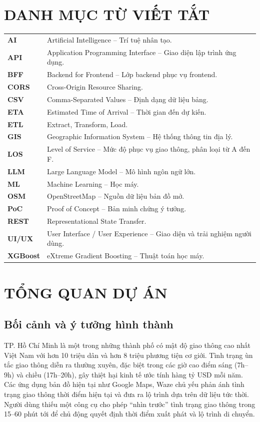 \documentclass[12pt,a4paper]{article}
\begin{document}
\section*{DANH MỤC TỪ VIẾT TẮT}
\begin{longtable}{L{3cm}L{11cm}}
\textbf{AI} & Artificial Intelligence -- Trí tuệ nhân tạo. \\
\textbf{API} & Application Programming Interface -- Giao diện lập trình ứng dụng. \\
\textbf{BFF} & Backend for Frontend -- Lớp backend phục vụ frontend. \\
\textbf{CORS} & Cross-Origin Resource Sharing. \\
\textbf{CSV} & Comma-Separated Values -- Định dạng dữ liệu bảng. \\
\textbf{ETA} & Estimated Time of Arrival -- Thời gian đến dự kiến. \\
\textbf{ETL} & Extract, Transform, Load. \\
\textbf{GIS} & Geographic Information System -- Hệ thống thông tin địa lý. \\
\textbf{LOS} & Level of Service -- Mức độ phục vụ giao thông, phân loại từ A đến F. \\
\textbf{LLM} & Large Language Model -- Mô hình ngôn ngữ lớn. \\
\textbf{ML} & Machine Learning -- Học máy. \\
\textbf{OSM} & OpenStreetMap -- Nguồn dữ liệu bản đồ mở. \\
\textbf{PoC} & Proof of Concept -- Bản minh chứng ý tưởng. \\
\textbf{REST} & Representational State Transfer. \\
\textbf{UI/UX} & User Interface / User Experience -- Giao diện và trải nghiệm người dùng. \\
\textbf{XGBoost} & eXtreme Gradient Boosting -- Thuật toán học máy. \\
\end{longtable}
\clearpage

\section{TỔNG QUAN DỰ ÁN}

\subsection{Bối cảnh và ý tưởng hình thành}
TP. Hồ Chí Minh là một trong những thành phố có mật độ giao thông cao nhất Việt Nam với hơn 10 triệu dân và hơn 8 triệu phương tiện cơ giới. Tình trạng ùn tắc giao thông diễn ra thường xuyên, đặc biệt trong các giờ cao điểm sáng (7h--9h) và chiều (17h--20h), gây thiệt hại kinh tế ước tính hàng tỷ USD mỗi năm. Các ứng dụng bản đồ hiện tại như Google Maps, Waze chủ yếu phản ánh tình trạng giao thông thời điểm hiện tại và đưa ra lộ trình dựa trên dữ liệu tức thời. Người dùng thiếu một công cụ cho phép ``nhìn trước'' tình trạng giao thông trong 15--60 phút tới để chủ động quyết định thời điểm xuất phát và lộ trình di chuyển.
\end{document}
